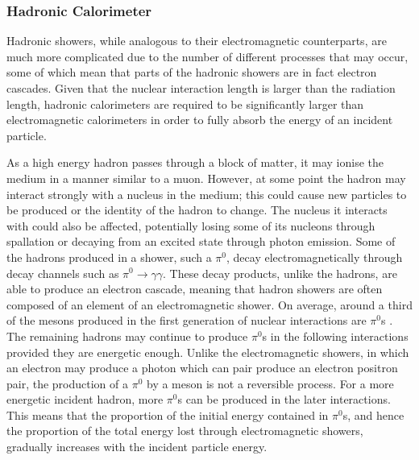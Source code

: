\documentclass{article}
\begin{document}
\subsubsection{Hadronic Calorimeter}
\label{sec:ATLAS_DetectorSchematics_HCAL}

Hadronic showers, while analogous to their electromagnetic counterparts, are much more complicated due to the number of different processes that may occur, some of which mean that parts of the hadronic showers are in fact electron cascades. Given that the nuclear interaction length is larger than the radiation length, hadronic calorimeters are required to be significantly larger than electromagnetic calorimeters in order to fully absorb the energy of an incident particle.

As a high energy hadron passes through a block of matter, it may ionise the medium in a manner similar to a muon. However, at some point the hadron may interact strongly with a nucleus in the medium; this could cause new particles to be produced or the identity of the hadron to change. The nucleus it interacts with could also be affected, potentially losing some of its nucleons through spallation or decaying from an excited state through photon emission. Some of the hadrons produced in a shower, such a $\pi^0$, decay electromagnetically through decay channels such as $\pi^0\rightarrow\gamma\gamma$. These decay products, unlike the hadrons, are able to produce an electron cascade, meaning that hadron showers are often composed of an element of an electromagnetic shower. On average, around a third of the mesons produced in the first generation of nuclear interactions are $\pi^0$s \cite{CalorimetryWigmans}. The remaining hadrons may continue to produce $\pi^0$s in the following interactions provided they are energetic enough. Unlike the electromagnetic showers, in which an electron may produce a photon which can pair produce an electron positron pair, the production of a $\pi^0$ by a meson is not a reversible process. For a more energetic incident hadron, more $\pi^0$s can be produced in the later interactions. This means that the proportion of the initial energy contained in $\pi^0$s, and hence the proportion of the total energy lost through electromagnetic showers, gradually increases with the incident particle energy.
\end{document}
